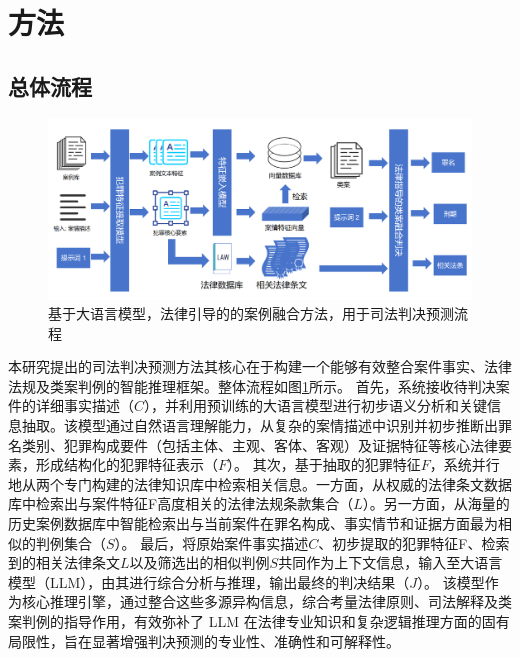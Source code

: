 \section{\heiti 方法}
\subsection{\heiti 总体流程}

\begin{figure}[htbp]
	\centering
	\includegraphics[width=1\textwidth]{fig/method.pdf}
	\caption{基于大语言模型，法律引导的的案例融合方法，用于司法判决预测流程}
	\label{fig:main}
\end{figure}

本研究提出的司法判决预测方法其核心在于构建一个能够有效整合案件事实、法律法规及类案判例的智能推理框架。整体流程如图\ref{fig:main}所示。
首先，系统接收待判决案件的详细事实描述（$C$），并利用预训练的大语言模型进行初步语义分析和关键信息抽取。该模型通过自然语言理解能力，从复杂的案情描述中识别并初步推断出罪名类别、犯罪构成要件（包括主体、主观、客体、客观）及证据特征等核心法律要素，形成结构化的犯罪特征表示（$F$）。
其次，基于抽取的犯罪特征$F$，系统并行地从两个专门构建的法律知识库中检索相关信息。一方面，从权威的法律条文数据库中检索出与案件特征F高度相关的法律法规条款集合（$L$）。另一方面，从海量的历史案例数据库中智能检索出与当前案件在罪名构成、事实情节和证据方面最为相似的判例集合（$S$）。
最后，将原始案件事实描述$C$、初步提取的犯罪特征F、检索到的相关法律条文$L$以及筛选出的相似判例$S$共同作为上下文信息，输入至大语言模型（LLM），由其进行综合分析与推理，输出最终的判决结果（$J$）。
该模型作为核心推理引擎，通过整合这些多源异构信息，综合考量法律原则、司法解释及类案判例的指导作用，有效弥补了 LLM 在法律专业知识和复杂逻辑推理方面的固有局限性，旨在显著增强判决预测的专业性、准确性和可解释性。


